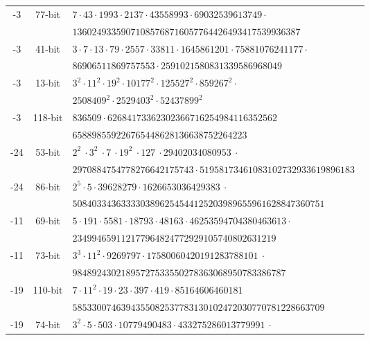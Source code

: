 \documentclass{amsart}
\begin{document}
\begin{table*}[ht]
\begin{tabularx}{\textwidth}{ccl}
        -3  &  77-bit & \tt $7 \cdot 43 \cdot 1993 \cdot 2137 \cdot 43558993 \cdot 69032539613749 \cdot$\\
                              	&   & \tt  $13602493359071085768716057764426493417539936387$ \\
        -3  &  41-bit & \tt $3 \cdot 7 \cdot 13 \cdot 79 \cdot 2557 \cdot 33811 \cdot 1645861201 \cdot 75881076241177 \cdot$\\
                              	&   & \tt  $86906511869757553 \cdot 2591021580831339586968049$  \\
        -3  &  13-bit & \tt $3^2 \cdot 11^2 \cdot 19^2 \cdot 10177^2 \cdot 125527^2 \cdot 859267^2 \cdot$\\
                      	&   & \tt   $2508409^2 \cdot 2529403^2 \cdot 52437899^2$  \\
        -3  &  118-bit & \tt $ 836509 \cdot 62684173362302366716254984116352562$\\
              	&   & \tt   $658898559226765448628136638752264223$  \\
        -24  &  53-bit & \tt $2^2 ~ \cdot 3^2 ~ \cdot 7 ~ \cdot 19^2 ~ \cdot 127 ~ \cdot 29402034080953  ~ \cdot $  \\
         			&   & \tt  $2970884754778276642175743  \cdot 51958173461083102732933619896183$  \\    
        -24  &  86-bit & \tt $2^5 \cdot 5 \cdot 39628279 \cdot 1626653036429383 ~ \cdot$  \\
         			&   & \tt  $5084033436333303896254544125203989655961628847360751$  \\    
        -11  &  69-bit & \tt $5 \cdot 191 \cdot 5581 \cdot 18793 \cdot 48163 \cdot 46253594704380463613 \cdot$  \\
         			&   & \tt  $234994659112177964824772929105740802631219$  \\    			
        -11  &  73-bit & \tt $3^3 \cdot 11^2 \cdot 9269797 \cdot 17580060420191283788101 ~\cdot$  \\
         			&   & \tt  $98489243021895727533550278363068950783386787$  \\   
        -19  &  110-bit & \tt $ 7 \cdot11^2  \cdot 19  \cdot 23  \cdot 397  \cdot 419 \cdot 85164606460181$  \\
         			&   & \tt $5853300746394355082537783130102472030770781228663709$  \\   
        -19  &  74-bit & \tt $ 3^2 \cdot 5 \cdot 503 \cdot 10779490483 \cdot 433275286013779991 ~\cdot$  \\

\end{tabularx}
\end{table*}
\end{document}
